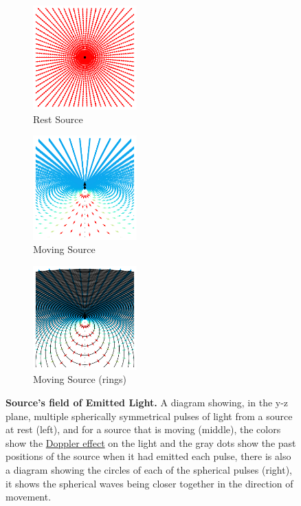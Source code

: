 \begin{figure}[H]
	\centering
	\begin{subfigure}{.325\textwidth}
		\centering
		\includegraphics[width = 4cm]{images/pdf/Field_Rest_Frame.pdf}
		\caption{Rest Source}
		\label{subfig_1: full field transformation 1}
	\end{subfigure}
	\begin{subfigure}{.325\textwidth}
		\centering
		\includegraphics[width = 4cm]{images/pdf/Field_Moving_Frame_Doppler.pdf}
		\caption{Moving Source}
		\label{subfig_2: full field transformation Moving Source}
	\end{subfigure}
	\begin{subfigure}{.325\textwidth}
		\centering
		\includegraphics[width = 4cm]{images/pdf/Field_Moving_Frame_Doppler_circles.pdf}
		\caption{Moving Source (rings)}
		\label{subfig_3: full field transformation Moving Source (rings)}
	\end{subfigure}
	\caption{\textbf{Source's field of Emitted Light.} A diagram showing, in the y-z plane, multiple spherically symmetrical pulses of light from a source at rest (left), and for a source that is moving (middle), the colors show the \protect\hyperlink{def-doppler-effect}{Doppler effect} on the light and the gray dots show the past positions of the source when it had emitted each pulse, there is also a diagram showing the circles of each of the spherical pulses (right), it shows the spherical waves being closer together in the direction of movement.}
	\label{fig: full field transformation}
\end{figure}

